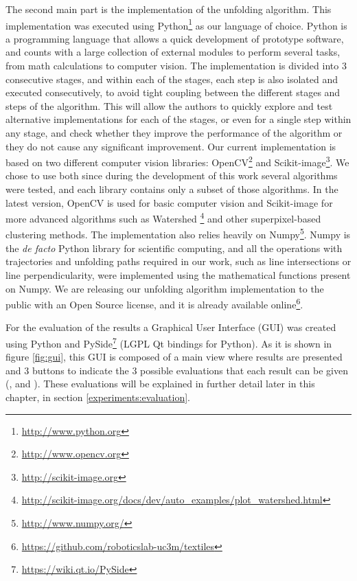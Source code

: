 The second main part is the implementation of the unfolding algorithm. This implementation was executed using Python\footnote{\url{http://www.python.org}} as our language of choice. Python is a programming language that allows a quick development of prototype software, and counts with a large collection of external modules to perform several tasks, from math calculations to computer vision. The implementation is divided into 3 consecutive stages, and within each of the stages, each step is also isolated and executed consecutively, to avoid tight coupling between the different stages and steps of the algorithm. This will allow the authors to quickly explore and test alternative implementations for each of the stages, or even for a single step within any stage, and check whether they improve the performance of the algorithm or they do not cause any significant improvement. Our current implementation is based on two different computer vision libraries: OpenCV\footnote{\url{http://www.opencv.org}} and Scikit-image\footnote{\url{http://scikit-image.org}}. We chose to use both since during the development of this work several algorithms were tested, and each library contains only a subset of those algorithms. In the latest version, OpenCV is used for basic computer vision and Scikit-image for more advanced algorithms such as Watershed \footnote{\url{http://scikit-image.org/docs/dev/auto_examples/plot_watershed.html}} and other superpixel-based clustering methods. The implementation also relies heavily on Numpy\footnote{\url{http://www.numpy.org/}}. Numpy is the \textit{de facto} Python library for scientific computing, and all the operations with trajectories and unfolding paths required in our work, such as line intersections or line perpendicularity, were implemented using the mathematical functions present on Numpy. We are releasing our unfolding algorithm implementation to the public with an Open Source license, and it is already available online\footnote{\url{https://github.com/roboticslab-uc3m/textiles}}.


For the evaluation of the results a Graphical User Interface (GUI) was created using Python and PySide\footnote{\url{https://wiki.qt.io/PySide}} (LGPL Qt bindings for Python). As it is shown in figure \ref{fig:gui}, this GUI is composed of a main view where results are presented and 3 buttons to indicate the 3 possible evaluations that each result can be given (\fail{}, \good{} and \great{}). These evaluations will be explained in further detail later in this chapter, in section \ref{experiments:evaluation}. 

